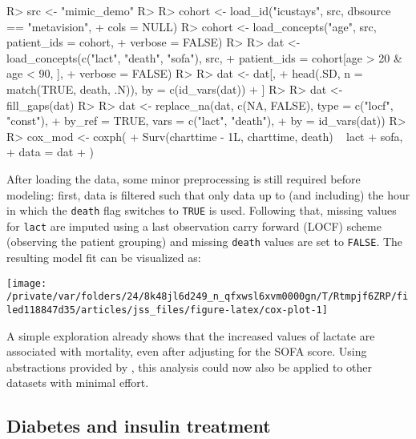 \documentclass[
  notitle,
  nojss,
  noheadings]{jss}
\begin{document}
\begin{CodeChunk}
\begin{CodeInput}
R> src <- "mimic_demo"
R> 
R> cohort <- load_id("icustays", src, dbsource == "metavision",
+                   cols = NULL)
R> cohort <- load_concepts("age", src, patient_ids = cohort,
+                         verbose = FALSE)
R> 
R> dat <- load_concepts(c("lact", "death", "sofa"), src,
+                      patient_ids = cohort[age > 20 & age < 90, ],
+                      verbose = FALSE)
R> 
R> dat <- dat[,
+   head(.SD, n = match(TRUE, death, .N)), by = c(id_vars(dat))
+ ]
R> 
R> dat <- fill_gaps(dat)
R> 
R> dat <- replace_na(dat, c(NA, FALSE), type = c("locf", "const"),
+                   by_ref = TRUE, vars = c("lact", "death"),
+                   by = id_vars(dat))
R> 
R> cox_mod <- coxph(
+   Surv(charttime - 1L, charttime, death) ~ lact + sofa,
+   data = dat
+ )
\end{CodeInput}
\end{CodeChunk}

After loading the data, some minor preprocessing is still required
before modeling: first, data is filtered such that only data up to (and
including) the hour in which the \texttt{death} flag switches to
\texttt{TRUE} is used. Following that, missing values for \texttt{lact}
are imputed using a last observation carry forward (LOCF) scheme
(observing the patient grouping) and missing \texttt{death} values are
set to \texttt{FALSE}. The resulting model fit can be visualized as:

\begin{CodeChunk}


\begin{center}\texttt{[image: /private/var/folders/24/8k48jl6d249\_n\_qfxwsl6xvm0000gn/T/Rtmpjf6ZRP/filed118847d35/articles/jss\_files/figure-latex/cox-plot-1]} \end{center}

\end{CodeChunk}

A simple exploration already shows that the increased values of lactate
are associated with mortality, even after adjusting for the SOFA score.
Using abstractions provided by , this analysis could now also
be applied to other datasets with minimal effort.

\hypertarget{diabetes-and-insulin-treatment}{%
\subsection{Diabetes and insulin
treatment}\label{diabetes-and-insulin-treatment}}
\end{document}
